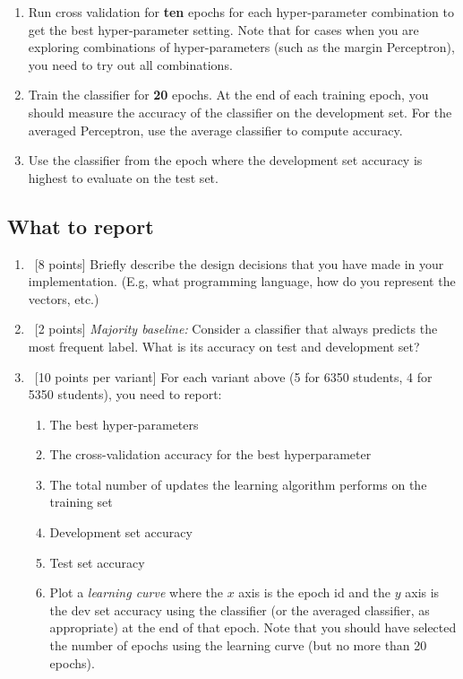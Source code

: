 \begin{enumerate}
\item Run cross validation for {\bf ten} epochs for each
  hyper-parameter combination to get the best hyper-parameter
  setting. Note that for cases when you are exploring combinations of
  hyper-parameters (such as the margin Perceptron), you need to try
  out all combinations.

\item Train the classifier for {\bf 20} epochs. At the end of each
  training epoch, you should measure the accuracy of the classifier on
  the development set. For the averaged Perceptron, use the average
  classifier to compute accuracy.

\item Use the classifier from the epoch where the development set
  accuracy is highest to evaluate on the test set.
\end{enumerate}

\subsection{What to report}

\begin{enumerate}
\item~[8 points] Briefly describe the design decisions that you have
  made in your implementation. (E.g, what programming language, how do
  you represent the vectors, etc.)
\item~[2 points] {\em Majority baseline:} Consider a classifier that
  always predicts the most frequent label. What is its accuracy on
  test and development set?
\item~[10 points per variant] For each variant above (5 for 6350 students, 4 for 5350 students), you need to report:
  \begin{enumerate}
  \item The best hyper-parameters
  \item The cross-validation accuracy for the best hyperparameter 
  \item The total number of updates the learning algorithm performs on the training set
  \item Development set accuracy
  \item Test set accuracy
  \item Plot a {\em learning curve} where the $x$ axis is the epoch id
    and the $y$ axis is the dev set accuracy using the classifier (or
    the averaged classifier, as appropriate) at the end of that
    epoch. Note that you should have selected the number of epochs
    using the learning curve (but no more than 20 epochs).
  \end{enumerate}
\end{enumerate}

